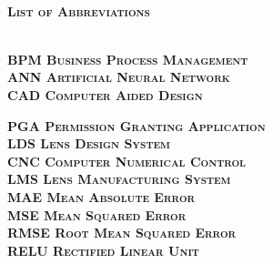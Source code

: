 \documentclass[10pt,a4paper]{report}
\begin{document}
\newpage
	\textsc{\large\bfseries }\\
	[1.5cm]
	\textsc{\Huge\bfseries\upshape List of Abbreviations}
	\setcounter{page}{2}
    \setcounter{page}{2}
	\vspace{2cm}\\
	\textsc{\Large\bfseries\justify BPM  \mdseries\hspace{2.0cm}\upshape\qquad\qquad Business Process Management }\\
	\vspace{0.3cm}
	\textsc{\Large\bfseries\justify ANN  \mdseries\hspace{2.0cm}\upshape\qquad\qquad Artificial Neural Network  }\\
	\vspace{0.3cm}
	\textsc{\Large\bfseries\justify CAD \mdseries\hspace{2.0cm}\upshape\qquad\qquad Computer Aided Design}\\
	\vspace{0.3cm}
	
	\textsc{\Large\bfseries\justify PGA \mdseries\hspace{2.0cm}\upshape\qquad\qquad Permission Granting Application}\\
	\vspace{0.3cm}
	\textsc{\Large\bfseries\justify LDS \mdseries\hspace{2.1cm}\upshape\qquad\qquad  Lens Design System }\\
	\vspace{0.3cm}
	\textsc{\Large\bfseries\justify CNC \mdseries\hspace{2.0cm}\upshape\qquad\qquad Computer Numerical Control}\\
		\vspace{0.3cm}
		\textsc{\Large\bfseries\justify LMS \mdseries\hspace{2.0cm}\upshape\qquad\qquad Lens Manufacturing System}\\
	\vspace{0.3cm}
	\textsc{\Large\bfseries\justify MAE \mdseries\hspace{2.9cm}\upshape\qquad\qquadTerm Mean Absolute Error }\\
	\vspace{0.3cm}
	\textsc{\Large\bfseries\justify MSE \mdseries\hspace{2.0cm}\upshape\qquad\qquad Mean Squared Error}\\
	\vspace{0.3cm}
	\textsc{\Large\bfseries\justify RMSE \mdseries\hspace{1.6cm}\upshape\qquad\qquad Root Mean Squared Error}\\
	\vspace{0.3cm}
	\textsc{\Large\bfseries\justify RELU \mdseries\hspace{1.65cm}\upshape\qquad\qquad Rectified Linear Unit }\\
	\vspace{0.3cm}
\clearpage
\end{document}

